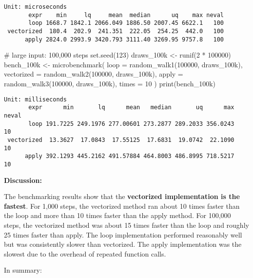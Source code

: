\documentclass[
  letterpaper,
  DIV=11,
  numbers=noendperiod]{scrartcl}
\newenvironment{Shaded}{\begin{snugshade}}{\end{snugshade}}
\newcommand{\AttributeTok}[1]{\textcolor[rgb]{0.40,0.45,0.13}{#1}}
\newcommand{\CommentTok}[1]{\textcolor[rgb]{0.37,0.37,0.37}{#1}}
\newcommand{\DecValTok}[1]{\textcolor[rgb]{0.68,0.00,0.00}{#1}}
\newcommand{\FunctionTok}[1]{\textcolor[rgb]{0.28,0.35,0.67}{#1}}
\newcommand{\NormalTok}[1]{\textcolor[rgb]{0.00,0.23,0.31}{#1}}
\newcommand{\OtherTok}[1]{\textcolor[rgb]{0.00,0.23,0.31}{#1}}
\newcommand{\SpecialCharTok}[1]{\textcolor[rgb]{0.37,0.37,0.37}{#1}}
\begin{document}
\begin{verbatim}
Unit: microseconds
       expr    min     lq     mean  median      uq    max neval
       loop 1668.7 1842.1 2066.049 1886.50 2007.45 6622.1   100
 vectorized  180.4  202.9  241.351  222.05  254.25  442.0   100
      apply 2824.0 2993.9 3420.793 3111.40 3269.95 9757.8   100
\end{verbatim}

\begin{Shaded}
\begin{Highlighting}[]
\CommentTok{\# large input: 100,000 steps}
\FunctionTok{set.seed}\NormalTok{(}\DecValTok{123}\NormalTok{)}
\NormalTok{draws\_100k }\OtherTok{\textless{}{-}} \FunctionTok{runif}\NormalTok{(}\DecValTok{2} \SpecialCharTok{*} \DecValTok{100000}\NormalTok{)}
\NormalTok{bench\_100k }\OtherTok{\textless{}{-}} \FunctionTok{microbenchmark}\NormalTok{(}
  \AttributeTok{loop =} \FunctionTok{random\_walk1}\NormalTok{(}\DecValTok{100000}\NormalTok{, draws\_100k),}
  \AttributeTok{vectorized =} \FunctionTok{random\_walk2}\NormalTok{(}\DecValTok{100000}\NormalTok{, draws\_100k),}
  \AttributeTok{apply =} \FunctionTok{random\_walk3}\NormalTok{(}\DecValTok{100000}\NormalTok{, draws\_100k),}
  \AttributeTok{times =} \DecValTok{10}
\NormalTok{)}
\FunctionTok{print}\NormalTok{(bench\_100k)}
\end{Highlighting}
\end{Shaded}

\begin{verbatim}
Unit: milliseconds
       expr      min       lq      mean   median       uq      max neval
       loop 191.7225 249.1976 277.00601 273.2877 289.2033 356.0243    10
 vectorized  13.3627  17.0843  17.55125  17.6831  19.0742  22.1090    10
      apply 392.1293 445.2162 491.57884 464.8003 486.8995 718.5217    10
\end{verbatim}

\textbf{Discussion:}

The benchmarking results show that the \textbf{vectorized implementation
is the fastest}. For 1,000 steps, the vectorized method ran about 10
times faster than the loop and more than 10 times faster than the apply
method. For 100,000 steps, the vectorized method was about 15 times
faster than the loop and roughly 25 times faster than apply. The loop
implementation performed reasonably well but was consistently slower
than vectorized. The apply implementation was the slowest due to the
overhead of repeated function calls.

In summary:
\end{document}

